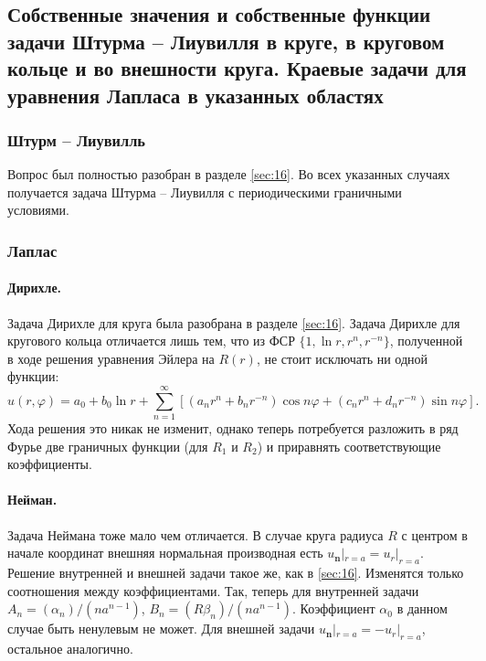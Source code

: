 \subsection{Собственные значения и собственные функции задачи Штурма -- Лиувилля
в круге, в круговом кольце и во внешности круга. Краевые задачи для уравнения
Лапласа в указанных областях}\label{sec:20}
\subsubsection{Штурм -- Лиувилль}
Вопрос был полностью разобран в разделе \ref{sec:16}. Во всех указанных случаях
получается задача Штурма -- Лиувилля с периодическими граничными условиями.

\subsubsection{Лаплас}
\paragraph{Дирихле.} Задача Дирихле для круга была разобрана в разделе \ref{sec:16}. Задача Дирихле
для кругового кольца отличается лишь тем, что из ФСР $ \{1, \ln r, r^n, r^{-n}\}
$, полученной в ходе решения уравнения Эйлера на $ R(r) $, не стоит исключать ни
одной функции:
\[
  u(r,\varphi) = a_0 + b_0\ln r + \sum_{n=1}^\infty [(a_nr^n + b_nr^{-n})\cos
  n\varphi + (c_n r^n + d_n r^{-n})\sin n\varphi].
\]
Хода решения это никак не изменит, однако теперь потребуется
разложить в ряд Фурье две граничных функции (для $ R_1 $ и $ R_2 $) и приравнять
соответствующие коэффициенты.

\paragraph{Нейман.} 
Задача Неймана тоже мало чем отличается. В случае круга радиуса $ R $ с центром
в начале координат внешняя нормальная производная есть $ u_{\mathbf n}|_{r = a}
= u_r|_{r = a}$. Решение внутренней и внешней задачи такое же, как в
\ref{sec:16}. Изменятся только соотношения между коэффициентами. Так, теперь для
внутренней задачи $
A_n = (\alpha_n)/(na^{n-1}) $, $ B_n = (R\beta_n)/(na^{n-1}) $. Коэффициент $
\alpha_0 $ в данном случае быть ненулевым не может. Для внешней задачи $
u_{\mathbf n}|_{r=a} = -u_r|_{r=a} $, остальное аналогично.

